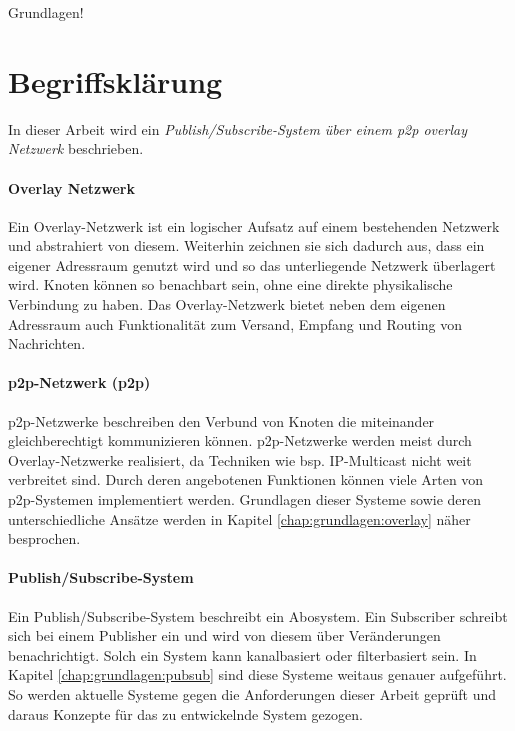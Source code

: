 Grundlagen!
\section{Begriffsklärung}
In dieser Arbeit wird ein \emph{Publish/Subscribe-System über einem \ac{p2p} overlay Netzwerk} beschrieben.

\paragraph{Overlay Netzwerk} Ein Overlay-Netzwerk ist ein logischer Aufsatz auf einem bestehenden Netzwerk und abstrahiert von diesem. Weiterhin zeichnen sie sich dadurch aus, dass ein eigener Adressraum genutzt wird und so das unterliegende Netzwerk überlagert wird. Knoten können so benachbart sein, ohne eine direkte physikalische Verbindung zu haben. Das Overlay-Netzwerk bietet neben dem eigenen Adressraum auch Funktionalität zum Versand, Empfang und Routing von Nachrichten.


\paragraph{\ac{p2p}-Netzwerk (p2p)} p2p-Netzwerke beschreiben den Verbund von Knoten die miteinander gleichberechtigt kommunizieren können. p2p-Netzwerke werden meist durch Overlay-Netzwerke realisiert, da Techniken wie bsp. IP-Multicast nicht weit verbreitet sind. Durch deren angebotenen Funktionen können viele Arten von p2p-Systemen implementiert werden. Grundlagen dieser Systeme sowie deren unterschiedliche Ansätze werden in Kapitel \ref{chap:grundlagen:overlay} näher besprochen.


\paragraph{Publish/Subscribe-System} Ein Publish/Subscribe-System beschreibt ein Abosystem. Ein Subscriber schreibt sich bei einem Publisher ein und wird von diesem über Veränderungen benachrichtigt. Solch ein System kann kanalbasiert oder filterbasiert sein. In Kapitel \ref{chap:grundlagen:pubsub} sind diese Systeme weitaus genauer aufgeführt. So werden aktuelle Systeme gegen die Anforderungen dieser Arbeit geprüft und daraus Konzepte für das zu entwickelnde System gezogen.


